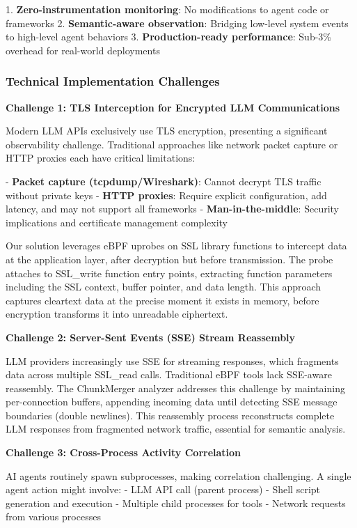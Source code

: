 \documentclass[sigplan,screen，review,9pt]{acmart}
\begin{document}
1. \textbf{Zero-instrumentation monitoring}: No modifications to agent code or frameworks
2. \textbf{Semantic-aware observation}: Bridging low-level system events to high-level agent behaviors
3. \textbf{Production-ready performance}: Sub-3\% overhead for real-world deployments

\subsubsection{Technical Implementation Challenges}

\textbf{Challenge 1: TLS Interception for Encrypted LLM Communications}

Modern LLM APIs exclusively use TLS encryption, presenting a significant observability challenge. Traditional approaches like network packet capture or HTTP proxies each have critical limitations:

- \textbf{Packet capture (tcpdump/Wireshark)}: Cannot decrypt TLS traffic without private keys
- \textbf{HTTP proxies}: Require explicit configuration, add latency, and may not support all frameworks
- \textbf{Man-in-the-middle}: Security implications and certificate management complexity

Our solution leverages eBPF uprobes on SSL library functions to intercept data at the application layer, after decryption but before transmission. The probe attaches to SSL\_write function entry points, extracting function parameters including the SSL context, buffer pointer, and data length. This approach captures cleartext data at the precise moment it exists in memory, before encryption transforms it into unreadable ciphertext.

\textbf{Challenge 2: Server-Sent Events (SSE) Stream Reassembly}

LLM providers increasingly use SSE for streaming responses, which fragments data across multiple SSL\_read calls. Traditional eBPF tools lack SSE-aware reassembly. The ChunkMerger analyzer addresses this challenge by maintaining per-connection buffers, appending incoming data until detecting SSE message boundaries (double newlines). This reassembly process reconstructs complete LLM responses from fragmented network traffic, essential for semantic analysis.

\textbf{Challenge 3: Cross-Process Activity Correlation}

AI agents routinely spawn subprocesses, making correlation challenging. A single agent action might involve:
- LLM API call (parent process)
- Shell script generation and execution
- Multiple child processes for tools
- Network requests from various processes
\end{document}
